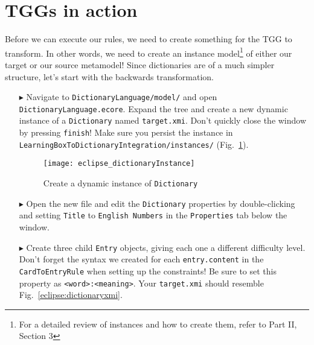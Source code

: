 \newpage
\section{TGGs in action}
\genHeader
\label{sect:TGGs_in_Action}

Before we can execute our rules, we need to create something for the TGG to transform. In other words, we need to create an instance model\footnote{For a
detailed review of instances and how to create them, refer to Part II, Section 3} of either our target or our source metamodel! Since dictionaries are of a much
simpler structure, let's start with the backwards transformation.

\begin{itemize}

\item[$\blacktriangleright$] Navigate to \texttt{Dictionary\-Language/model/} and open \texttt{Dictio\-nary\-Lang\-uage.ecore}. Expand the tree and create a new
dynamic instance of a \texttt{Dictionary} named \texttt{target.xmi}. Don't quickly close the window by pressing \texttt{finish}! Make sure you persist the instance in
\texttt{Learn\-ing\-Box\-To\-Dictionary\-In\-te\-gra\-tion/in\-stan\-ces/} (Fig.~\ref{eclipse:create_instance_dict}).

\begin{figure}[htbp]
\begin{center}
  \texttt{[image: eclipse\_dictionaryInstance]}
  \caption{Create a dynamic instance of \texttt{Dictionary}}
  \label{eclipse:create_instance_dict}
\end{center}
\end{figure}

\newpage

\item[$\blacktriangleright$] Open the new file and edit the \texttt{Dictionary} properties by double-clicking and setting \texttt{Title} to \texttt{English
Numbers} in the \texttt{Properties} tab below the window.

\vspace{0.5cm}

\item[$\blacktriangleright$] Create three child \texttt{Entry} objects, giving each one a different difficulty level. Don't forget the syntax we created for
each \texttt{entry.content} in the \texttt{CardToEntryRule} when setting up the constraints! Be sure to set this property as \texttt{<word>:<meaning>}. Your
\texttt{target.xmi} should resemble Fig.~\ref{eclipse:dictionaryxmi}.


\end{itemize}
